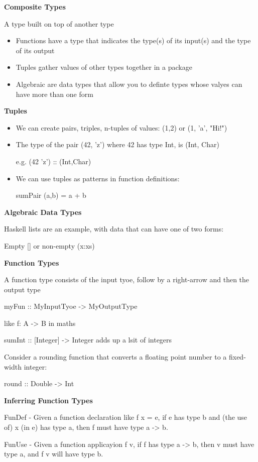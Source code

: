 \documentclass{article}
\begin{document}
\textbf{Composite Types}

A type built on top of another type

\begin{itemize}
\item Functions have a type that indicates the type(s) of its input(s) and the type of its output
\item Tuples gather values of other types together in a package
\item Algebraic are data types that allow you to definte types whose valyes can have more than one form

\end{itemize}


\textbf{Tuples}
\begin{itemize}

\item We can create pairs, triples, n-tuples of values: (1,2) or (1, 'a', "Hi!")
\item The type of the pair (42, 'z') where 42 has type Int, is (Int, Char)

e.g. (42 'z') :: (Int,Char)

\item We can use tuples as patterns in function definitions:

sumPair (a,b) = a + b

\end{itemize}


\textbf{Algebraic Data Types}

Haskell lists are an example, with data that can have one of two forms:

Empty [] or non-empty (x:xs)


\textbf{Function Types}

A function type consists of the input tyoe, follow by a right-arrow and then the output type

myFun :: MyInputTyoe -> MyOutputType

like f: A -> B in maths

sumInt :: [Integer] -> Integer adds up a lsit of integers

Consider a rounding function that converts a floating point number to a fixed-width integer:

round :: Double -> Int


\textbf{Inferring Function Types}

FunDef - Given a function declaration like f x = e, if e has type b and (the use of) x (in e) has type a, then f must have type a -> b.

FunUse - Given a function applicayion f v, if f has type a -> b, then v must have type a, and f v will have type b.
\end{document}
